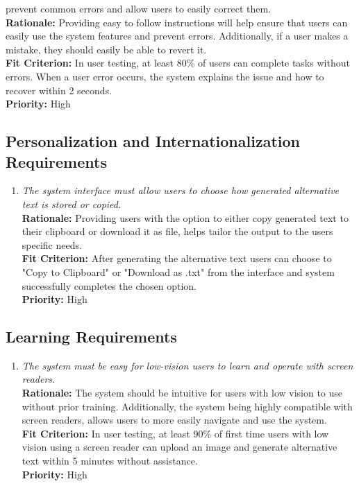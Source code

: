 \documentclass[12pt]{article}
\begin{document}
\begin{enumerate}[label=UHR-EUR \arabic*., wide=0pt, leftmargin=*]
{    prevent common errors and allow users to easily correct them.}\\[2mm]
    {\bf Rationale:} Providing easy to follow instructions will help
    ensure that users can easily use the system features and prevent
    errors. Additionally, if a user makes a mistake, they should
    easily be able to revert it.  \\
    {\bf Fit Criterion:} In user testing, at least 80\% of users can
    complete tasks without errors. When a user error occurs, the
    system explains the issue and how to recover within 2 seconds.\\
    {\bf Priority:} High
\end{enumerate}

\subsection{Personalization and Internationalization Requirements}
\begin{enumerate}[label=UHR-PIR \arabic*., wide=0pt, leftmargin=*]
  \item \emph{The system interface must allow users to choose how
    generated alternative text is stored or copied.}\\[2mm]
    {\bf Rationale:} Providing users with the option to either copy
    generated text to their clipboard or download it as file, helps
    tailor the output to the users specific needs.  \\
    {\bf Fit Criterion:} After generating the alternative text users
    can choose to "Copy to Clipboard" or "Download as .txt" from the
    interface and system successfully completes the chosen option.\\
    {\bf Priority:} High
\end{enumerate}

\subsection{Learning Requirements}
\begin{enumerate}[label=UHR-LR \arabic*., wide=0pt, leftmargin=*]
  \item \emph{The system must be easy for low-vision users to learn
    and operate with screen readers.}\\[2mm]
    {\bf Rationale:} The system should be intuitive for users with
    low vision to use without prior training. Additionally, the
    system being highly compatible with screen readers, allows users
    to more easily navigate and use the system.  \\
    {\bf Fit Criterion:} In user testing, at least 90\% of first time
    users with low vision using a screen reader can upload an image
    and generate alternative text within 5 minutes without assistance. \\
    {\bf Priority:} High
\end{enumerate}
\end{document}
